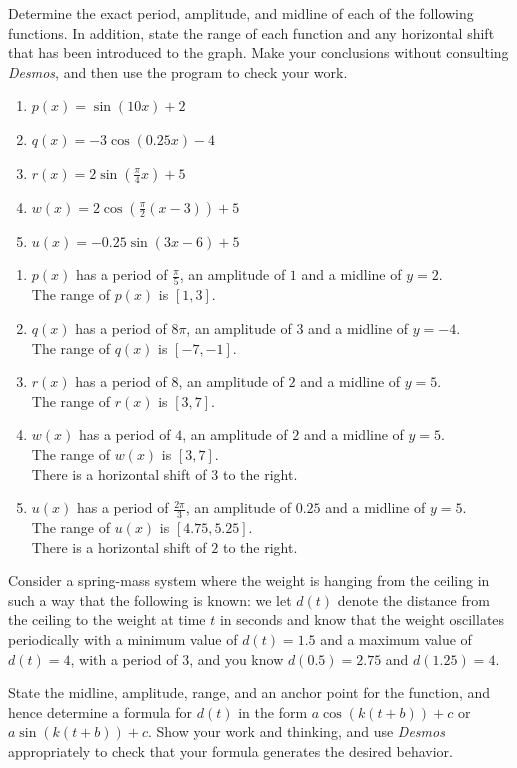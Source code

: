 \documentclass{ximera}
\begin{document}
\begin{example}
Determine the exact period, amplitude, and midline of each of the following functions.  In addition,  state the range of each function and any horizontal shift that has been introduced to the graph.  Make your conclusions without consulting \emph{Desmos}, and then use the program to check your work.%

\begin{enumerate}[label=\alph*.]
\item
\(p(x) = \sin(10x) + 2\)%
\item
\(q(x) = -3\cos(0.25x) - 4\)%
\item
\(r(x) = 2\sin\left( \frac{\pi}{4} x\right) + 5\)%
\item
\(w(x) = 2\cos\left( \frac{\pi}{2} (x-3) \right) + 5\)%
\item
\(u(x) = -0.25\sin\left(3x-6\right) + 5\)%
\end{enumerate}
\begin{explanation}
\begin{enumerate}[label=\alph*.]
\item
$p(x)$ has a period of $\frac{\pi}{5}$, an amplitude of $1$ and a midline of $y=2$. \\
The range of $p(x)$ is $[1,3]$.
\item
$q(x)$ has a period of $8\pi$, an amplitude of $3$ and a midline of $y=-4$. \\
The range of $q(x)$ is $[-7, -1]$.
\item
$r(x)$ has a period of $8$, an amplitude of $2$ and a midline of $y=5$. \\
 The range of $r(x)$ is $[3, 7]$.
\item
$w(x)$ has a period of $4$, an amplitude of $2$ and a midline of $y=5$.\\
The range of $w(x)$ is $[3, 7]$. \\
There is a horizontal shift of $3$ to the right.
\item
$u(x)$ has a period of $\frac{2\pi}{3}$, an amplitude of $0.25$ and a midline of $y=5$. \\
The range of $u(x)$ is $[4.75, 5.25]$. \\
There is a horizontal shift of $2$ to the right.
\end{enumerate}
\end{explanation}
\end{example}
\begin{exploration}
Consider a spring-mass system where the weight is hanging from the ceiling in such a way that the following is known: we let \(d(t)\) denote the distance from the ceiling to the weight at time \(t\) in seconds and know that the weight oscillates periodically with a minimum value of \(d(t) = 1.5\) and a maximum value of \(d(t) = 4\), with a period of \(3\), and you know \(d(0.5) = 2.75\) and \(d\left(1.25\right) = 4\).%

State the midline, amplitude, range, and an anchor point for the function, and hence determine a formula for \(d(t)\) in the form \(a\cos(k(t+b))+c\) or \(a\sin(k(t+b))+c\). Show your work and thinking, and use \emph{Desmos} appropriately to check that your formula generates the desired behavior.%
\end{exploration}
\end{document}
